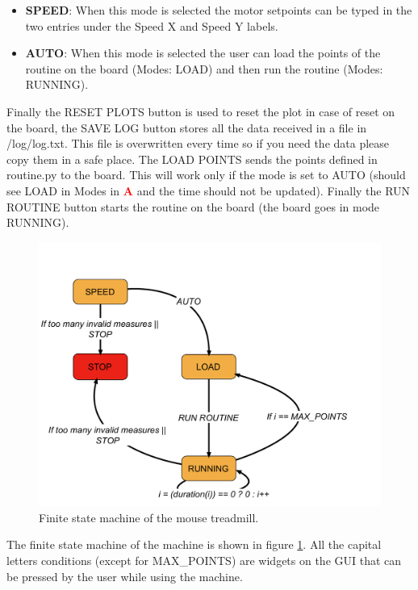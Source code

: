 \documentclass[12pt,a4paper, twoside]{article}
\begin{document}
\begin{itemize}
\begin{itemize}
		\item \textbf{SPEED}: When this mode is selected the motor setpoints can be typed in the two entries under the Speed X and Speed Y labels.
		\item \textbf{AUTO}: When this mode is selected the user can load the points of the routine on the board (Modes: LOAD) and then run the routine (Modes: RUNNING).
	\end{itemize} 
	Finally the RESET PLOTS button is used to reset the plot in case of reset on the board, the SAVE LOG button stores all the data received in a file in /log/log.txt. This file is overwritten every time so if you need the data please copy them in a safe place. The LOAD POINTS sends the points defined in routine.py to the board. This will work only if the mode is set to AUTO (should see LOAD in Modes in  \textcolor{red}{\textbf{A}} and the time should not be updated). Finally the RUN ROUTINE button starts the routine on the board (the board goes in mode RUNNING).	
\end{itemize}  
\begin{figure}[H]
	\centering
	\includegraphics[width=0.7\linewidth]{fig/FSM.pdf}
	\caption{Finite state machine of the mouse treadmill.}\label{fig:FSM}
\end{figure}
The finite state machine of the machine is shown in figure \ref{fig:FSM}. All the capital letters conditions (except for MAX\_POINTS) are widgets on the GUI that can be pressed by the user while using the machine.
\end{document}
